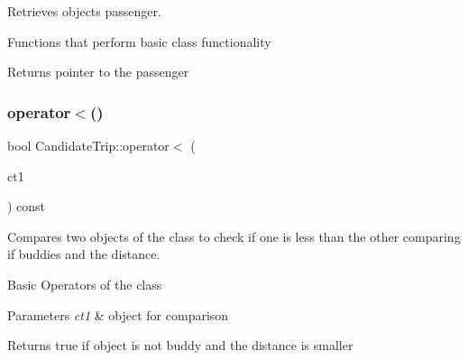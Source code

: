 Retrieves object\textquotesingle{}s passenger. 

Functions that perform basic class functionality \begin{DoxyReturn}{Returns}
pointer to the passenger 
\end{DoxyReturn}
\mbox{\label{group___candidate_trip_gafa6782199d3dbf1f72509bd201516889}} 
\subsubsection{\texorpdfstring{operator$<$()}{operator<()}}
{\footnotesize\ttfamily bool Candidate\+Trip\+::operator$<$ (\begin{DoxyParamCaption}\item[{const \hyperlink{class_candidate_trip}{Candidate\+Trip} \&}]{ct1 }\end{DoxyParamCaption}) const}



Compares two objects of the class to check if one is less than the other comparing if buddies and the distance. 

Basic Operators of the class 
\begin{DoxyParams}{Parameters}
{\em ct1} & object for comparison\\
\hline
\end{DoxyParams}
\begin{DoxyReturn}{Returns}
true if object is not buddy and the distance is smaller 
\end{DoxyReturn}

